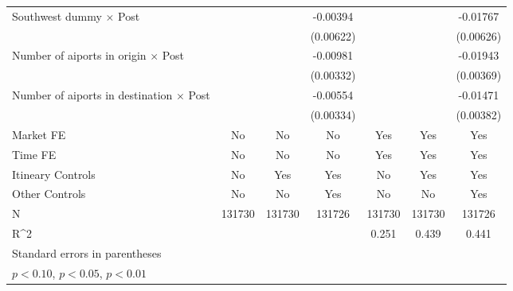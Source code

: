 \begin{table}[htbp]
\begin{tabular}{l*{6}{c}}
\addlinespace
Southwest dummy $\times$ Post&                     &                     &    -0.00394         &                     &                     &    -0.01767\sym{***}\\
                    &                     &                     &   (0.00622)         &                     &                     &   (0.00626)         \\
\addlinespace
Number of aiports in origin $\times$ Post&                     &                     &    -0.00981\sym{***}&                     &                     &    -0.01943\sym{***}\\
                    &                     &                     &   (0.00332)         &                     &                     &   (0.00369)         \\
\addlinespace
Number of aiports in destination $\times$ Post&                     &                     &    -0.00554\sym{*}  &                     &                     &    -0.01471\sym{***}\\
                    &                     &                     &   (0.00334)         &                     &                     &   (0.00382)         \\
\midrule
Market FE           &          No         &          No         &          No         &         Yes         &         Yes         &         Yes         \\
Time FE             &          No         &          No         &          No         &         Yes         &         Yes         &         Yes         \\
Itineary Controls   &          No         &         Yes         &         Yes         &          No         &         Yes         &         Yes         \\
Other Controls      &          No         &          No         &         Yes         &          No         &          No         &         Yes         \\
N                   &      131730         &      131730         &      131726         &      131730         &      131730         &      131726         \\
R^2                 &                     &                     &                     &       0.251         &       0.439         &       0.441         \\
\bottomrule
\multicolumn{7}{l}{\footnotesize Standard errors in parentheses}\\
\multicolumn{7}{l}{\footnotesize \sym{*} \(p<0.10\), \sym{**} \(p<0.05\), \sym{***} \(p<0.01\)}\\
\end{tabular}
\end{table}
